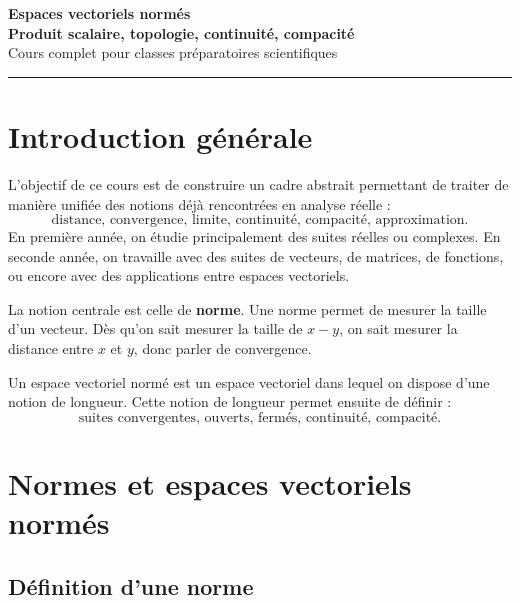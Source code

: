 \documentclass[11pt,a4paper]{article}
\begin{document}
\begin{center}
    {\Huge \textbf{Espaces vectoriels normés}}\\[2mm]
    {\Large \textbf{Produit scalaire, topologie, continuité, compacité}}\\[2mm]
    {\large Cours complet pour classes préparatoires scientifiques}\\[2mm]
    \rule{0.8\linewidth}{0.5pt}
\end{center}

\vspace{0.5cm}

\tableofcontents

\newpage

\section*{Introduction générale}

L'objectif de ce cours est de construire un cadre abstrait permettant de traiter de manière unifiée des notions déjà rencontrées en analyse réelle :
\[
\text{distance, convergence, limite, continuité, compacité, approximation.}
\]
En première année, on étudie principalement des suites réelles ou complexes. En seconde année, on travaille avec des suites de vecteurs, de matrices, de fonctions, ou encore avec des applications entre espaces vectoriels.

La notion centrale est celle de \textbf{norme}. Une norme permet de mesurer la taille d'un vecteur. Dès qu'on sait mesurer la taille de \(x-y\), on sait mesurer la distance entre \(x\) et \(y\), donc parler de convergence.

\begin{retenirbox}
Un espace vectoriel normé est un espace vectoriel dans lequel on dispose d'une notion de longueur.  
Cette notion de longueur permet ensuite de définir :
\[
\text{suites convergentes, ouverts, fermés, continuité, compacité.}
\]
\end{retenirbox}

\section{Normes et espaces vectoriels normés}

\subsection{Définition d'une norme}
\end{document}
